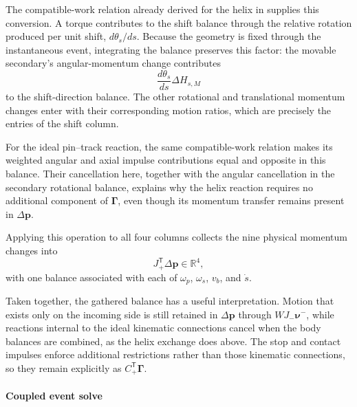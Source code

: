 \documentclass[11pt]{report}
\numberwithin{equation}{section}
\begin{document}
The compatible-work relation already derived for the helix in
 supplies this conversion.
A torque contributes to the shift balance through the relative rotation
produced per unit shift, \(d\theta_s/ds\). Because the geometry is fixed
through the instantaneous event, integrating the balance preserves this
factor: the movable secondary's angular-momentum change contributes
\[
    \frac{d\theta_s}{ds}\Delta H_{s,M}
\]
to the shift-direction balance. The other rotational and translational
momentum changes enter with their corresponding motion ratios, which
are precisely the entries of the shift column.

For the ideal pin--track reaction, the same compatible-work relation
makes its weighted angular and axial impulse contributions equal and
opposite in this balance. Their cancellation here, together with the
angular cancellation in the secondary rotational balance, explains why
the helix reaction requires no additional component of
\(\boldsymbol\Gamma\), even though its momentum transfer remains present
in \(\Delta\boldsymbol p\).

Applying this operation to all four columns collects the nine physical
momentum changes into
\begin{equation}
    J_+^{\mathsf T}\Delta\boldsymbol p
    \in\mathbb R^4,
    \label{eq:finite_event_generalized_momentum_change}
\end{equation}
with one balance associated with each of
\(\omega_p\), \(\omega_s\), \(v_b\), and \(\dot s\).

Taken together, the gathered balance has a useful interpretation.
Motion that exists only on the incoming side is still retained in
\(\Delta\boldsymbol p\) through \(WJ_-\boldsymbol\nu^-\), while
reactions internal to the ideal kinematic connections cancel when the
body balances are combined, as the helix exchange does above.  The stop
and contact impulses enforce additional restrictions rather than those
kinematic connections, so they remain explicitly as
\(C_+^{\mathsf T}\boldsymbol\Gamma\).

\paragraph{Coupled event solve}
\end{document}
